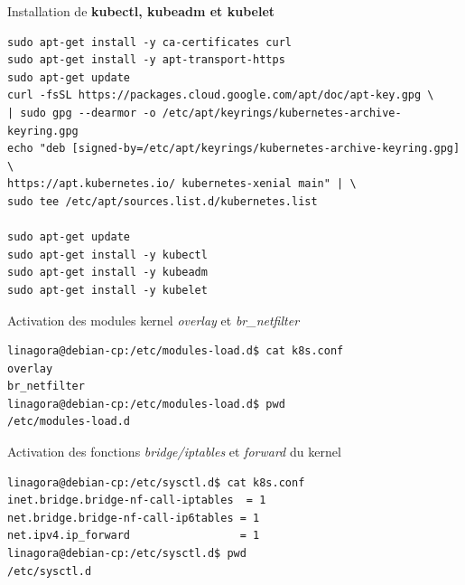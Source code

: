 \begin{frame}[fragile,shrink=0.9]{Installation de \textbf{kubectl, kubeadm et kubelet}}

\begin{tiny}
\begin{Verbatim}[commandchars=\&\#\#]
sudo apt-get install -y ca-certificates curl
sudo apt-get install -y apt-transport-https
sudo apt-get update
curl -fsSL https://packages.cloud.google.com/apt/doc/apt-key.gpg \
| sudo gpg --dearmor -o /etc/apt/keyrings/kubernetes-archive-keyring.gpg
echo "deb [signed-by=/etc/apt/keyrings/kubernetes-archive-keyring.gpg] \
https://apt.kubernetes.io/ kubernetes-xenial main" | \
sudo tee /etc/apt/sources.list.d/kubernetes.list

sudo apt-get update
sudo apt-get install -y kubectl
sudo apt-get install -y kubeadm
sudo apt-get install -y kubelet
\end{Verbatim}
\end{tiny}

\end{frame}


\begin{frame}[fragile]{Activation des modules kernel \textit{overlay} et \textit{br\_netfilter}}

\begin{tiny}
\begin{Verbatim}[commandchars=\&\#\#]
linagora@debian-cp:/etc/modules-load.d$ cat k8s.conf 
overlay
br_netfilter
linagora@debian-cp:/etc/modules-load.d$ pwd
/etc/modules-load.d
\end{Verbatim}
\end{tiny}

\end{frame}


\begin{frame}[fragile]{Activation des fonctions \textit{bridge/iptables} et \textit{forward} du kernel}

\begin{tiny}
\begin{Verbatim}[commandchars=\&\#\#]
linagora@debian-cp:/etc/sysctl.d$ cat k8s.conf 
inet.bridge.bridge-nf-call-iptables  = 1
net.bridge.bridge-nf-call-ip6tables = 1
net.ipv4.ip_forward                 = 1
linagora@debian-cp:/etc/sysctl.d$ pwd
/etc/sysctl.d
\end{Verbatim}
\end{tiny}

\end{frame}

